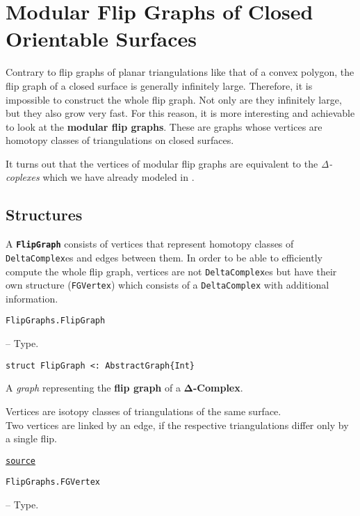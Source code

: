 \chapter{Modular Flip Graphs of Closed Orientable Surfaces}



\label{691037665121027587}{}




Contrary to flip graphs of planar triangulations like that of a convex polygon, the flip graph of a closed surface is generally infinitely large. Therefore, it is impossible to construct the whole flip graph. Not only are they infinitely large, but they also {\textquotedbl}grow{\textquotedbl} very fast. For this reason, it is more interesting and achievable to look at the \textbf{modular flip graphs}. These are graphs whose vertices are homotopy classes of triangulations on closed surfaces.



It turns out that the vertices of modular flip graphs are equivalent to the \emph{Δ-coplexes} which we have already modeled in .



\section{Structures}



\label{15035490444877811912}{}


A \textbf{\texttt{FlipGraph}} consists of vertices that represent homotopy classes of \texttt{DeltaComplex}es and edges between them.  In order to be able to efficiently compute the whole flip graph, vertices are not \texttt{DeltaComplex}es but have their own structure (\texttt{FGVertex}) which consists of a \texttt{DeltaComplex} with additional information.


\hypertarget{14918097106326738732}{\texttt{FlipGraphs.FlipGraph}}  -- {Type.}

\begin{adjustwidth}{2em}{0pt}


\begin{verbatim}
struct FlipGraph <: AbstractGraph{Int}
\end{verbatim}

A \emph{graph} representing the \textbf{flip graph} of a \textbf{Δ-Complex}.

Vertices are isotopy classes of triangulations of the same surface.\\
Two vertices are linked by an edge, if the respective triangulations differ only by a single flip.



\href{https://github.com/schto223/FlipGraphs.jl/blob/e35d43698a06b86273148826b79d585ba04fcd26/src/flipGraph.jl#L151-L158}{\texttt{source}}


\end{adjustwidth}
\hypertarget{120589140144457623}{\texttt{FlipGraphs.FGVertex}}  -- {Type.}

